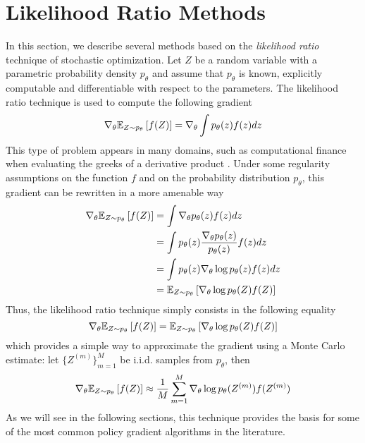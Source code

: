 \section{Likelihood Ratio Methods}
In this section, we describe several methods based on the \emph{likelihood ratio} technique of stochastic optimization. Let $Z$ be a random variable with a parametric probability density $p_\theta$ and assume that $p_\theta$ is known, explicitly computable and differentiable with respect to the parameters. The likelihood ratio technique is used to compute the following gradient
\begin{equation*}
	\nabla_\theta \E[Z \sim p_\theta]{f(Z)} = \nabla_\theta \int p_\theta(z) f(z) dz
\end{equation*}
This type of problem appears in many domains, such as computational finance when evaluating the greeks of a derivative product \cite{pages2016introduction}. Under some regularity assumptions on the function $f$ and on the probability distribution $p_\theta$, this gradient can be rewritten in a more amenable way
\begin{equation*}
	\begin{split}
		\nabla_\theta \E[Z \sim p_\theta]{f(Z)} &= \int \nabla_\theta p_\theta(z) f(z) dz\\
		&= \int p_\theta(z) \frac{\nabla_\theta p_\theta(z)}{p_\theta(z)} f(z) dz\\
		&= \int p_\theta(z) \nabla_\theta \log p_\theta(z) f(z) dz\\
		&= \E[Z\sim p_\theta]{\nabla_\theta \log p_\theta(Z) f(Z)}
	\end{split}
\end{equation*}
Thus, the likelihood ratio technique simply consists in the following equality
\begin{equation}
	\nabla_\theta \E[Z \sim p_\theta]{f(Z)} = \E[Z\sim p_\theta]{\nabla_\theta \log p_\theta(Z) f(Z)}
\end{equation}
which provides a simple way to approximate the gradient using a Monte Carlo estimate: let $\{Z^{(m)}\}_{m=1}^M$ be i.i.d. samples from $p_\theta$, then 
\begin{equation}
	\nabla_\theta \E[Z \sim p_\theta]{f(Z)} \approx \frac{1}{M} \sum_{m=1}^M \nabla_\theta \log p_\theta(Z^{(m)}) f(Z^{(m)})	
\end{equation}
As we will see in the following sections, this technique provides the basis for some of the most common policy gradient algorithms in the literature. 

